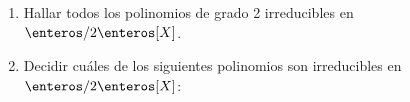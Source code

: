 \begin{enunciado}{\ejercicio}
  \begin{enumerate}[label=\roman*)]
    \item Hallar todos los polinomios de grado 2 irreducibles en $\enteros/2\enteros[X]$.
    \item Decidir cuáles de los siguientes polinomios son irreducibles en $\enteros/2\enteros[X]$:
          \begin{enumerate}[label=(\alph*)]
          \end{enumerate}
  \end{enumerate}
\end{enunciado}


